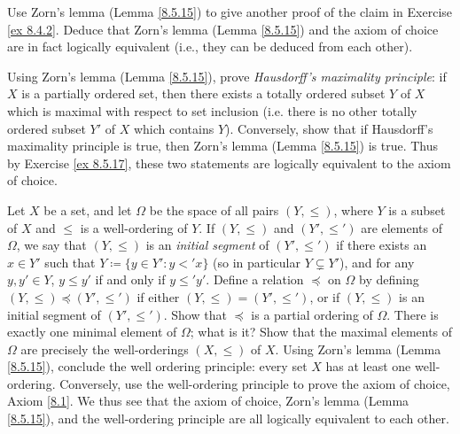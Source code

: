 \begin{exercise}\label{ex 8.5.17}
    Use Zorn's lemma (Lemma \ref{8.5.15}) to give another proof of the claim in Exercise \ref{ex 8.4.2}.
    Deduce that Zorn's lemma (Lemma \ref{8.5.15}) and the axiom of choice are in fact logically equivalent
    (i.e., they can be deduced from each other).
\end{exercise}

\begin{exercise}\label{ex 8.5.18}
    Using Zorn's lemma (Lemma \ref{8.5.15}), prove \emph{Hausdorff's maximality principle}:
    if \(X\) is a partially ordered set, then there exists a totally ordered subset \(Y\) of \(X\) which is maximal with respect to set inclusion
    (i.e. there is no other totally ordered subset \(Y'\) of \(X\) which contains \(Y\)).
    Conversely, show that if Hausdorff's maximality principle is true, then Zorn's lemma (Lemma \ref{8.5.15}) is true.
    Thus by Exercise \ref{ex 8.5.17}, these two statements are logically equivalent to the axiom of choice.
\end{exercise}

\begin{exercise}\label{ex 8.5.19}
    Let \(X\) be a set, and let \(\Omega\) be the space of all pairs \((Y, \leq)\), where \(Y\) is a subset of \(X\) and \(\leq\) is a well-ordering of \(Y\).
    If \((Y, \leq)\) and \((Y', \leq')\) are elements of \(\Omega\), we say that \((Y, \leq)\) is an \emph{initial segment} of \((Y', \leq')\) if there exists an \(x \in Y'\) such that \(Y \coloneqq \{y \in Y' : y <' x\}\) (so in particular \(Y \subsetneq Y'\)), and for any \(y, y' \in Y\), \(y \leq y'\) if and only if \(y \leq' y'\).
    Define a relation \(\preceq\) on \(\Omega\) by defining \((Y, \leq) \preceq (Y', \leq')\) if either \((Y, \leq) = (Y', \leq')\), or if \((Y, \leq)\) is an initial segment of \((Y', \leq')\).
    Show that \(\preceq\) is a partial ordering of \(\Omega\).
    There is exactly one minimal element of \(\Omega\);
    what is it?
    Show that the maximal elements of \(\Omega\) are precisely the well-orderings \((X, \leq)\) of \(X\).
    Using Zorn's lemma (Lemma \ref{8.5.15}), conclude the well ordering principle:
    every set \(X\) has at least one well-ordering.
    Conversely, use the well-ordering principle to prove the axiom of choice, Axiom \ref{8.1}.
    We thus see that the axiom of choice, Zorn's lemma (Lemma \ref{8.5.15}), and the well-ordering principle are all logically equivalent to each other.
\end{exercise}


